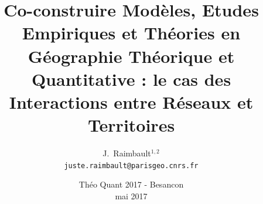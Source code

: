 \documentclass[english,11pt]{beamer}
\begin{document}
\title{Co-construire Modèles, Etudes Empiriques et Théories en Géographie Théorique et Quantitative : le cas des Interactions entre Réseaux et Territoires}

\author{J.~Raimbault$^{1,2}$\\
\texttt{juste.raimbault@parisgeo.cnrs.fr}
}




\date{Théo Quant 2017 - Besancon\\ mai 2017
}

\frame{\maketitle}





\end{document}

